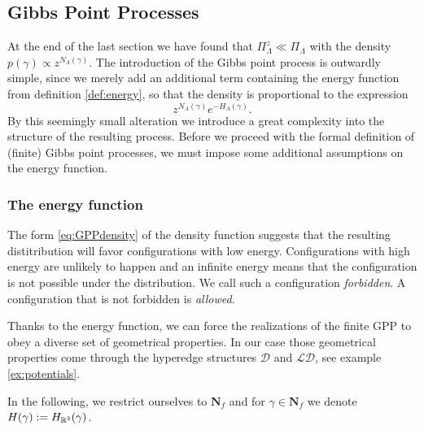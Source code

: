 \subsection{Gibbs Point Processes}
At the end of the last section we have found that $\Pi^z_\Lambda \ll \Pi_\Lambda$ with the density $p(\gamma) \propto z^{N_\Lambda(\gamma)}$. The introduction of the Gibbs point process is outwardly simple, since we merely add an additional term containing the energy function from definition \ref{def:energy}, so that the density is proportional to the expression
\begin{equation}\label{eq:GPPdensity}z^{N_\Lambda(\gamma)} e^{-H_\Lambda (\gamma)}.\end{equation}
By this seemingly small alteration we introduce a great complexity into the structure of the resulting process. Before we proceed with the formal definition of (finite) Gibbs point processes, we must impose some additional assumptions on the energy function.


\subsubsection{The energy function}

The form \ref{eq:GPPdensity} of the density function suggests that the resulting distitribution will favor configurations with low energy. Configurations with high energy are unlikely to happen and an infinite energy means that the configuration is not possible under the distribution. We call such a configuration \textit{forbidden}. A configuration that is not forbidden is \textit{allowed}. 

Thanks to the energy function, we can force the realizations of the finite GPP to obey a diverse set of geometrical properties. In our case those geometrical properties come through the hyperedge structures $\mathcal D$ and $\mathcal {LD}$, see example \ref{ex:potentials}. 

In the following, we restrict ourselves to $\mathbf N_f$ and for $\gamma \in \mathbf N_f$ we denote $H(\gamma):= H_{\mathbb R^3}(\gamma)$.\newline 

